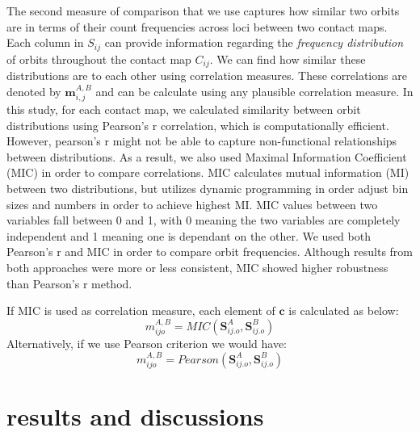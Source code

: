 \documentclass[a4,center,fleqn]{NAR}
\begin{document}
The second measure of comparison that we use captures how 
similar two orbits are in terms of their count 
frequencies across loci between two contact maps. 
Each column in $S_{ij}$ can provide information
regarding the \textit{frequency distribution} of orbits throughout
the contact map $C_{ij}$. 
We can find how similar these distributions are to each other using
correlation measures.
These correlations are denoted by $\mathbf{m}^{\scriptscriptstyle A,B}_{i,j}$ and
can be calculate using
any plausible correlation measure. 
In this study, for each contact map,  we calculated
similarity between orbit distributions using Pearson's r 
correlation, which is computationally efficient.
However, pearson's r might not be able to capture
non-functional relationships between distributions. As a result, we
also used Maximal Information Coefficient (MIC) 
\cite{reshef2011detecting} in order to compare
correlations. MIC calculates mutual information (MI) between two
distributions, but utilizes dynamic programming in order adjust
bin sizes and numbers in order to achieve highest MI.
MIC values between two variables fall between 0 and 1,
with 0 meaning the two variables are completely independent
and 1 meaning one is dependant on the other.
We used both Pearson's r and MIC in order to compare orbit
frequencies. Although results from both approaches were more
or less consistent, MIC showed higher robustness than Pearson's 
r method.

If MIC is used as correlation measure, each element of 
 $\mathbf{c}$ is calculated as below:
\begin{equation}
    m^{\scriptscriptstyle A,B}_{ijo} = MIC(\mathbf{S}^A_{ij.o}, \mathbf{S}^B_{ij.o})
    \label{eq:mic}
\end{equation}
Alternatively, if we use Pearson criterion we would have:
\begin{equation}
    m^{\scriptscriptstyle A,B}_{ijo} = Pearson(\mathbf{S}^A_{ij.o}, \mathbf{S}^B_{ij.o})
    \label{eq:pearson}
\end{equation}

\section{results and discussions}
\end{document}
